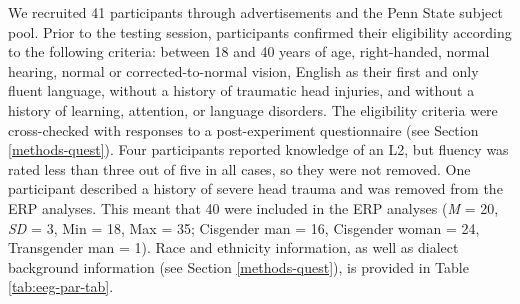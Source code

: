 \documentclass[
  12pt,
  twoside]{article}
\begin{document}
We recruited 41 participants through advertisements and the Penn State subject pool.
Prior to the testing session, participants confirmed their eligibility according to the following criteria: between 18 and 40 years of age, right-handed, normal hearing, normal or corrected-to-normal vision, English as their first and only fluent language, without a history of traumatic head injuries, and without a history of learning, attention, or language disorders.
The eligibility criteria were cross-checked with responses to a post-experiment questionnaire (see Section \ref{methods-quest}).
Four participants reported knowledge of an L2, but fluency was rated less than three out of five in all cases, so they were not removed.
One participant described a history of severe head trauma and was removed from the ERP analyses.
This meant that 40 were included in the ERP analyses (\emph{M} = 20, \emph{SD} = 3, Min = 18, Max = 35; Cisgender man = 16, Cisgender woman = 24, Transgender man = 1).
Race and ethnicity information, as well as dialect background information (see Section \ref{methods-quest}), is provided in Table \ref{tab:eeg-par-tab}.

\begin{table}

\caption{\label{tab:eeg-par-tab}Participant demographic information}
\centering
{}
\end{table}
\end{document}
